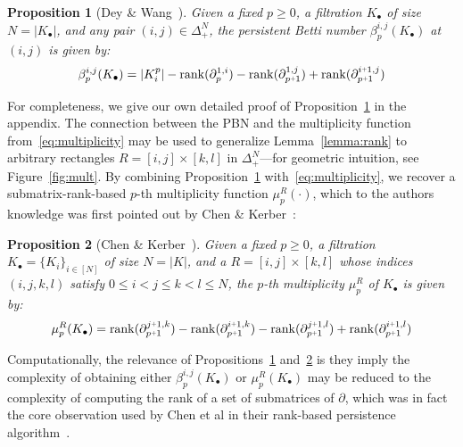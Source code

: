 \documentclass[12pt]{article}
\numberwithin{equation}{section}
\newcommand{\+}{%
	\raisebox{0.18ex}{\scaleobj{0.55}{+}}
}
\newtheorem{proposition}{Proposition}
\theoremstyle{definition}
\begin{document}
\begin{proposition}[Dey \& Wang~\cite{dey2022computational}]\label{prop:rank_reduction}
Given a fixed $p \geq 0$, a filtration $K_\bullet$ of size $N = \lvert K_\bullet \rvert$, and any pair $(i,j) \in \Delta_+^N$, the persistent Betti number $\beta_p^{i,j}(K_\bullet)$ at $(i,j)$ is given by:
	\begin{equation}\label{eq:betti_four}
	\beta_p^{i,j}(K_\bullet) = \lvert K_i^p \rvert - \mathrm{rank}(\partial_p^{1,i}) - \mathrm{rank}(\partial_{p\+1 }^{1,j}) + \mathrm{rank}(\partial_{p\+1}^{i \+ 1, j} )
	\end{equation}
\end{proposition}
\noindent For completeness, we give our own detailed proof of Proposition~\ref{prop:rank_reduction} in the appendix. 
The connection between the PBN and the multiplicity function from~\eqref{eq:multiplicity} may be used to generalize Lemma~\ref{lemma:rank} to arbitrary rectangles $R = [i,j] \times [k,l]$ in $\Delta_+^N$---for geometric intuition, see Figure~\ref{fig:mult}.
By combining Proposition~\ref{prop:rank_reduction} with~\eqref{eq:multiplicity}, we recover a submatrix-rank-based $p$-th multiplicity function $\mu_p^{R}(\cdot)$, which to the authors knowledge was first pointed out by Chen \& Kerber~\cite{chen2011output}: 
\begin{proposition}[Chen \& Kerber~\cite{chen2011output}]\label{prop:mu_reduction}
Given a fixed $p \geq 0$, a filtration $K_\bullet = \{K_i\}_{i\in [N]}$ of size $N = \lvert K \rvert$, and a $R = [i,j] \times [k,l]$ whose indices $(i,j,k,l)$ satisfy $0 \leq i < j \leq k < l \leq N$, the $p$-th multiplicity $\mu_p^{R}$ of $K_\bullet$ is given by:
	\begin{equation}\label{eq:mu_four}
	\mu_p^{R}(K_\bullet) = \mathrm{rank}(\partial_{p\+1}^{j \+ 1, k})  - \mathrm{rank}(\partial_{p\+1}^{i \+ 1, k})  - \mathrm{rank}(\partial_{p\+1}^{j \+ 1, l}) + \mathrm{rank}(\partial_{p\+1}^{i \+ 1, l}) 
	\end{equation}
\end{proposition}
\noindent Computationally, the relevance of Propositions~\ref{prop:rank_reduction} and~\ref{prop:mu_reduction} is they imply the complexity of obtaining either $\beta_p^{i,j}(K_\bullet)$ or $\mu_p^{R}(K_\bullet)$ may be reduced to the complexity of computing the rank of a set of submatrices of $\partial$, which was in fact the core observation used by Chen et al in their rank-based persistence algorithm~\cite{chen2011output}.
\end{document}

